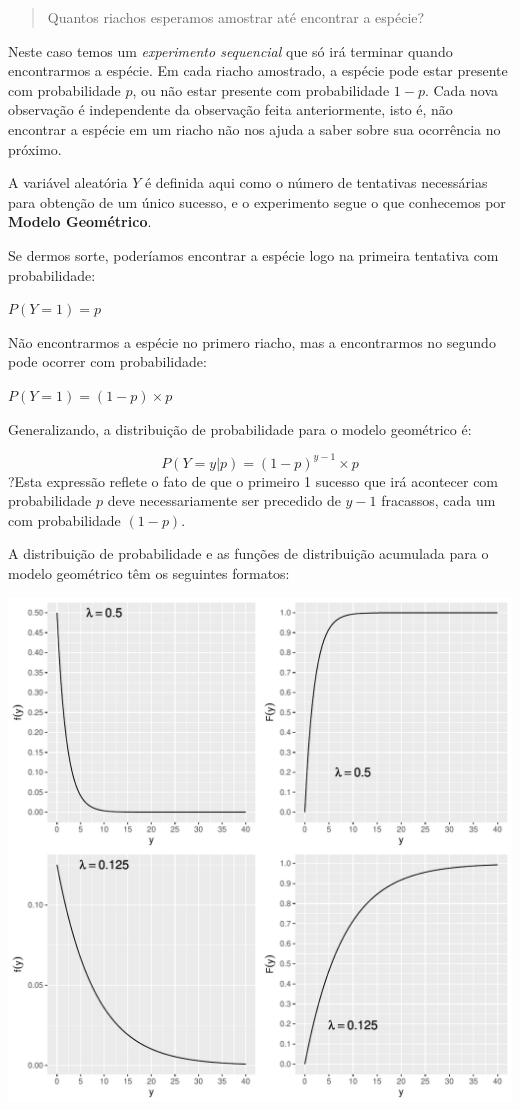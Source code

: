\documentclass[
]{book}
\begin{document}
\begin{quote}
Quantos riachos esperamos amostrar até encontrar a espécie?
\end{quote}

Neste caso temos um \emph{experimento sequencial} que só irá terminar quando encontrarmos a espécie. Em cada riacho amostrado, a espécie pode estar presente com probabilidade \(p\), ou não estar presente com probabilidade \(1-p\). Cada nova observação é independente da observação feita anteriormente, isto é, não encontrar a espécie em um riacho não nos ajuda a saber sobre sua ocorrência no próximo.

A variável aleatória \(Y\) é definida aqui como o número de tentativas necessárias para obtenção de um único sucesso, e o experimento segue o que conhecemos por \textbf{Modelo Geométrico}.

Se dermos sorte, poderíamos encontrar a espécie logo na primeira tentativa com probabilidade:

\(P(Y = 1) = p\)

Não encontrarmos a espécie no primero riacho, mas a encontrarmos no segundo pode ocorrer com probabilidade:

\(P(Y = 1) = (1-p) \times p\)

Generalizando, a distribuição de probabilidade para o modelo geométrico é:

\[P(Y = y|p) = (1-p)^{y-1} \times p\]
?Esta expressão reflete o fato de que o primeiro 1 sucesso que irá acontecer com probabilidade \(p\) deve necessariamente ser precedido de \(y-1\) fracassos, cada um com probabilidade \((1-p)\).

A distribuição de probabilidade e as funções de distribuição acumulada para o modelo geométrico têm os seguintes formatos:

\begin{center}\includegraphics{probest-cambientais_files/figure-latex/unnamed-chunk-207-1} \end{center}
\end{document}
